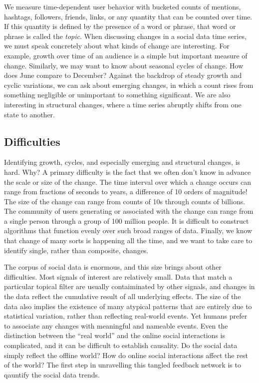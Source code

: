 \documentclass{article}
\begin{document}
We measure time-dependent user behavior with bucketed counts of mentions,
hashtags, followers, friends, links, or any quantity that can be counted over
time. If this quantity is defined by the presence of a word or phrase, that
word or phrase is called the \textit{topic}. When discussing changes in a
social data time series, we must speak concretely about what kinds of change
are interesting. For example, growth over time of an audience is a simple but
important measure of change. Similarly, we may want to know about seasonal
cycles of change. How does June compare to December? Against the backdrop of
steady growth and cyclic variations, we can ask about emerging changes, in
which a count rises from something negligible or unimportant to something
significant. We are also interesting in structural changes, where a time series
abruptly shifts from one state to another.

\subsection{Difficulties} Identifying growth, cycles, and especially emerging
and structural changes, is hard. Why? A primary difficulty is the fact that we
often don’t know in advance the scale or size of the change. The time interval
over which a change occurs can range from fractions of seconds to years, a
difference of 10 orders of magnitude! The size of the change can range from
counts of 10s through counts of billions. The community of users generating or
associated with the change can range from a single person through a group of
100 million people. It is difficult to construct algorithms that function
evenly over such broad ranges of data. Finally, we know that change of many
sorts is happening all the time, and we want to take care to identify single,
rather than composite, changes.

The corpus of social data is enormous, and this size brings about other
difficulties. Most signals of interest are relatively small.  Data that match a
particular topical filter are usually contaiminated by other signals, and
changes in the data reflect the cumulative result of all underlying effects.
The size of the data also implies the existence of many atypical patterns that
are entirely due to statistical variation, rather than reflecting real-world
events. Yet humans prefer to associate any changes with meaningful and
nameable events. 
Even
the distinction between the “real world” and the online social interactions is
complicated, and it can be
difficult to establish causality. Do the social data simply reflect the offline
world? How do online social interactions affect the rest of the world? 
The first step in unravelling this tangled feedback network is to 
qauntify the social data trends.  
\end{document}
